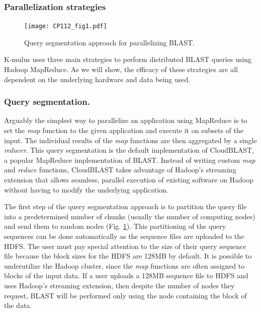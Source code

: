 \documentclass[12pt,\mydriver]{thesis}
\begin{document}
\subsubsection{Parallelization strategies}

\begin{figure}[!htb]\begin{center}
\texttt{[image: CP112\_fig1.pdf]}
\end{center}
\renewcommand{\baselinestretch}{1}
\small\normalsize
\begin{quote}
\caption[Query segmentation approach for parallelizing BLAST]{Query segmentation approach for parallelizing BLAST.}
\label{fig:strategies}
\end{quote}
\end{figure}
\renewcommand{\baselinestretch}{2}
\small\normalsize


K-mulus uses three main strategies to perform distributed BLAST queries using Hadoop MapReduce.
As we will show, the efficacy of these strategies are all dependent on the underlying hardware and data being used.
\subsubsection{Query segmentation.}
Arguably the simplest way to parallelize an application using MapReduce is to set the \emph{map} function to the given application and execute it on subsets of the input.
The individual results of the \emph{map} functions are then aggregated by a single \emph{reducer}.
This query segmentation is the default implementation of CloudBLAST\cite{matsunaga2008cloudblast}, a popular MapReduce implementation of BLAST.
Instead of writing custom \emph{map} and \emph{reduce} functions, CloudBLAST takes advantage of Hadoop's streaming extension that allows seamless, parallel execution of existing software on Hadoop without having to modify the underlying application.

The first step of the query segmentation approach is to partition the query file into a predetermined number of chunks (usually the number of computing nodes) and send them to random nodes (Fig. \ref{fig:strategies}).
This partitioning of the query sequences can be done automatically as the sequence files are uploaded to the HDFS.
The user must pay special attention to the size of their query sequence file because the block sizes for the HDFS are 128MB by default.
It is possible to underutilize the Hadoop cluster, since the \emph{map} functions are often assigned to blocks of the input data.
If a user uploads a 128MB sequence file to HDFS and uses Hadoop's streaming extension, then despite the number of nodes they request, BLAST will be performed only using the node containing the block of the data.
\end{document}
